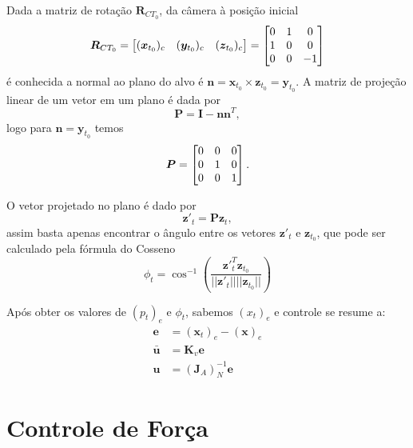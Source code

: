 Dada a matriz de rotação $\bm{R}_{CT_0}$, da câmera à posição inicial
\begin{equation}
\bm{R}_{CT_0} = \begin{bmatrix} (\bm{x}_{t_0})_c & (\bm{y}_{t_0})_c  & (\bm{z}_{t_0})_c\end{bmatrix} = 
\begin{bmatrix}
	0 & 1 & 0 \\
	1 & 0 & 0 \\
	0 & 0 & -1
\end{bmatrix}
\end{equation}
é conhecida a normal ao plano do alvo é $\bm{n} = \bm{x}_{t_0} \times \bm{z}_{t_0} =  \bm{y}_{t_0} $. A matriz de projeção linear \citep{strang} de um vetor em um plano é dada por
\begin{equation}
\bm{P} = \bm{I} - \bm{n} \bm{n}^T,
\end{equation}
logo para $\bm{n} = \bm{y}_{t_0}$ temos 
\begin{equation}
\bm{P} =  \begin{bmatrix}
	 0  &   0  &   0 \\
     0  &   1  &   0 \\
     0  &   0  &   1
\end{bmatrix}.
\end{equation}

O vetor projetado no plano é dado por
\begin{equation}
\bm{z'}_{t} = \bm{P} \bm{z}_{t},
\end{equation}
assim basta apenas encontrar o ângulo entre os vetores $\bm{z'}_{t}$ e $\bm{z}_{t_0}$, que pode ser calculado pela fórmula do Cosseno \citep{strang} 
\begin{equation}
\phi_t = \cos^{-1} \left( \frac{\bm{z'}^T_{t} \bm{z}_{t_0} } {||\bm{z'}_{t}|| ||\bm{z}_{t_0}||} \right)
\end{equation}




Após obter os valores de $(p_t)_e$ e $\phi_t$, sabemos $(x_t)_e$ e controle se resume a:
\begin{align}
\bm{e} &= (\bm{x}_t)_e - (\bm{x})_e \\
\bm{\bar{u}} &= \bm{K}_v \bm{e}  \\
\bm{u} &= (\bm{J}_{A})_N^{-1} \bm{e}
\end{align}

\section{Controle de Força} \label{sec:force}

